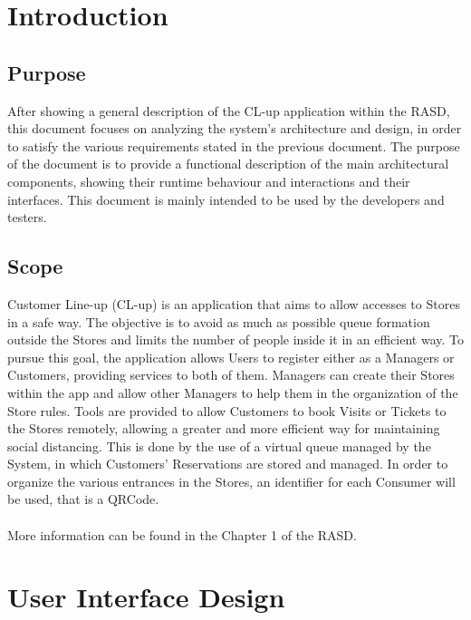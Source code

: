 \documentclass[a4paper, 12pt, oneside, table]{article}
\begin{document}
\normalsize


\newpage
\tableofcontents
\newpage

\section{Introduction}
\subsection{Purpose}
After showing a general description of the CL-up application within the RASD, this document focuses on analyzing the system's architecture and design, in order to satisfy the various requirements stated in the previous document. The purpose of the document is to provide a functional description of the main architectural components, showing their runtime behaviour and interactions and their interfaces. This document is mainly intended to be used by the developers and testers.

\subsection{Scope}
Customer Line-up (CL-up) is an application that aims to allow accesses to Stores in a safe way. The objective is to avoid as much as possible queue formation outside the Stores and limits the number of people inside it in an efficient way. To pursue this goal, the application allows Users to register either as a Managers or Customers, providing services to both of them. Managers can create their Stores within the app and allow other Managers to help them in the organization of the Store rules. Tools are provided to allow Customers to book Visits or Tickets to the Stores remotely, allowing a greater and more efficient way for maintaining social distancing. This is done by the use of a virtual queue managed by the System, in which Customers' Reservations are stored and managed. In order to organize the various entrances in the Stores, an identifier for each Consumer will be used, that is a QRCode.\\ %
\\
More information can be found in the Chapter 1 of the RASD.

\newpage
\section{User Interface Design}
\end{document}
